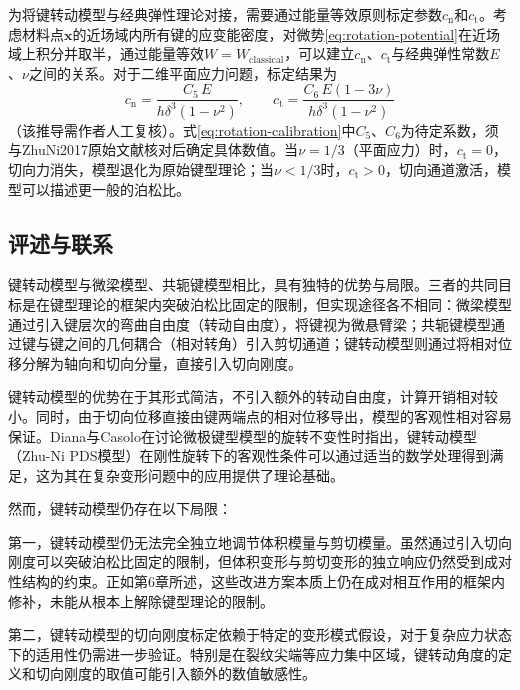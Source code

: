 为将键转动模型与经典弹性理论对接，需要通过能量等效原则标定参数$c_{\mathrm{n}}$和$c_{\mathrm{t}}$。考虑材料点$\mathbf{x}$的近场域内所有键的应变能密度，对微势\eqref{eq:rotation-potential}在近场域上积分并取半，通过能量等效$W=W_{\mathrm{classical}}$，可以建立$c_{\mathrm{n}}$、$c_{\mathrm{t}}$与经典弹性常数$E$、$\nu$之间的关系。对于二维平面应力问题，标定结果为
\begin{equation}
  c_{\mathrm{n}}=\frac{C_{5}\,E}{h\delta^{3}(1-\nu^{2})},
  \qquad
  c_{\mathrm{t}}=\frac{C_{6}\,E(1-3\nu)}{h\delta^{3}(1-\nu^{2})}
  \label{eq:rotation-calibration}
\end{equation}
（该推导需作者人工复核）。式\eqref{eq:rotation-calibration}中$C_{5}$、$C_{6}$为待定系数，须与ZhuNi2017原始文献核对后确定具体数值。当$\nu=1/3$（平面应力）时，$c_{\mathrm{t}}=0$，切向力消失，模型退化为原始键型理论；当$\nu<1/3$时，$c_{\mathrm{t}}>0$，切向通道激活，模型可以描述更一般的泊松比。


\subsection{评述与联系}\label{sec:rotation-review}

键转动模型与微梁模型、共轭键模型相比，具有独特的优势与局限。三者的共同目标是在键型理论的框架内突破泊松比固定的限制，但实现途径各不相同：微梁模型通过引入键层次的弯曲自由度（转动自由度），将键视为微悬臂梁；共轭键模型通过键与键之间的几何耦合（相对转角）引入剪切通道；键转动模型则通过将相对位移分解为轴向和切向分量，直接引入切向刚度。

键转动模型的优势在于其形式简洁，不引入额外的转动自由度，计算开销相对较小。同时，由于切向位移直接由键两端点的相对位移导出，模型的客观性相对容易保证。Diana与Casolo\cite{DianaCasolo2019}在讨论微极键型模型的旋转不变性时指出，键转动模型（Zhu-Ni PDS模型）在刚性旋转下的客观性条件可以通过适当的数学处理得到满足，这为其在复杂变形问题中的应用提供了理论基础。

然而，键转动模型仍存在以下局限：

第一，键转动模型仍无法完全独立地调节体积模量与剪切模量。虽然通过引入切向刚度可以突破泊松比固定的限制，但体积变形与剪切变形的独立响应仍然受到成对性结构的约束。正如第6章所述，这些改进方案本质上仍在成对相互作用的框架内修补，未能从根本上解除键型理论的限制。

第二，键转动模型的切向刚度标定依赖于特定的变形模式假设，对于复杂应力状态下的适用性仍需进一步验证。特别是在裂纹尖端等应力集中区域，键转动角度的定义和切向刚度的取值可能引入额外的数值敏感性。

